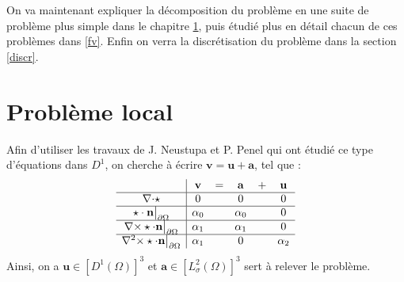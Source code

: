 On va maintenant expliquer la décomposition du problème en une suite de problème plus simple dans le chapitre \ref{local}, puis étudié plus en détail chacun de ces problèmes dans \ref{fv}. Enfin on verra la discrétisation du problème dans la section \ref{discr}.

\section{Problème local}
\label{local}

Afin d'utiliser les travaux de J. Neustupa et P. Penel qui ont étudié ce type d'équations dans $D^1$, on cherche à écrire $\mathbf{v}=\mathbf{u}+\mathbf{a}$, tel que :\\
\begin{equation}
\label{v}
\begin{array}{c|ccccc}
& \mathbf{v} & = & \mathbf{a} & + & \mathbf{u}\\ \hline
{\nabla\cdot}\star & 0 & & 0 & & 0\\ \hline
\star\cdot \mathbf{n}{\big\rvert_{\partial\Omega}} & \alpha_0 & & \alpha_0 & & 0\\ \hline
{\nabla\times}\star\cdot \mathbf{n}{\big\rvert_{\partial\Omega}} & \alpha_1 & & \alpha_1 & & 0\\ \hline
{\nabla^2\times}\star\cdot \mathbf{n}{\big\rvert_{\partial\Omega}} & \alpha_1 & & 0 & & \alpha_2
\end{array}
\end{equation}
Ainsi, on a $\mathbf{u}\in [D^1(\Omega)]^3$ et $\mathbf{a}\in [L_\sigma^2(\Omega)]^3$ sert à relever le problème.


